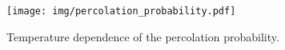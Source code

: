 \begin{figure}[h]
\begin{minipage}[c]{0.7\textwidth}
    \begin{center}
        \texttt{[image: img/percolation\_probability.pdf]}
    \end{center}
\end{minipage}
\begin{minipage}[c]{0.29\textwidth}
    \caption{Temperature dependence of the percolation probability.}
    \label{fig:percolation_probability}
\end{minipage}
\end{figure}

